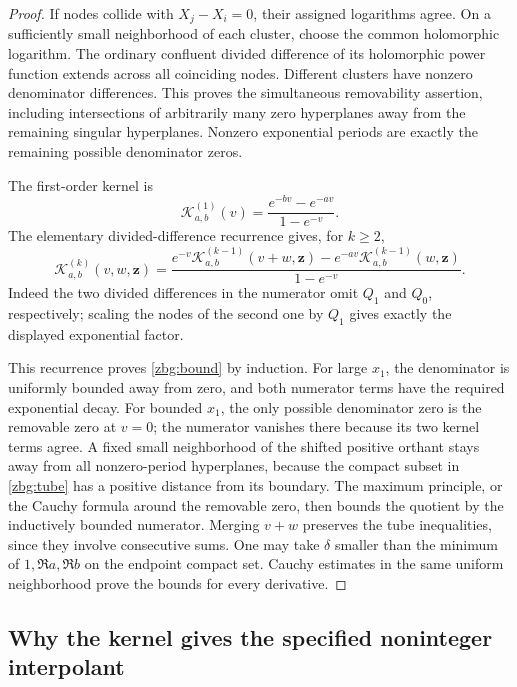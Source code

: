 \begin{proof}
If nodes collide with $X_j-X_i=0$, their assigned logarithms agree.
On a sufficiently small neighborhood of each cluster, choose the common
holomorphic logarithm.  The ordinary confluent divided difference of
its holomorphic power function extends across all coinciding nodes.
Different clusters have nonzero denominator differences.  This proves
the simultaneous removability assertion, including intersections of
arbitrarily many zero hyperplanes away from the remaining singular
hyperplanes. Nonzero exponential periods are
exactly the remaining possible denominator zeros.

The first-order kernel is
\[
 \mathscr K_{a,b}^{(1)}(v)=\frac{e^{-bv}-e^{-av}}{1-e^{-v}}.
\]
The elementary divided-difference recurrence gives, for $k\geq2$,
\begin{equation}\label{zbg:recurrence}
 \mathscr K_{a,b}^{(k)}(v,w,\boldsymbol z)=
 \frac{e^{-v}\mathscr K_{a,b}^{(k-1)}(v+w,\boldsymbol z)
       -e^{-av}\mathscr K_{a,b}^{(k-1)}(w,\boldsymbol z)}
      {1-e^{-v}}.
\end{equation}
Indeed the two divided differences in the numerator omit $Q_1$ and
$Q_0$, respectively; scaling the nodes of the second one by $Q_1$
gives exactly the displayed exponential factor.

This recurrence proves \eqref{zbg:bound} by induction.  For large
$x_1$, the denominator is uniformly bounded away from zero, and both
numerator terms have the required exponential decay.  For bounded
$x_1$, the only possible denominator zero is the removable zero at
$v=0$; the numerator vanishes there because its two kernel terms agree.  A fixed small neighborhood of the shifted positive orthant
stays away from all nonzero-period hyperplanes, because the compact
subset in \eqref{zbg:tube} has a positive distance from its boundary.
The maximum principle, or the Cauchy formula around the removable
zero, then bounds the quotient by the inductively bounded numerator.
Merging $v+w$ preserves the tube inequalities, since they involve
consecutive sums.  One may take $\delta$ smaller than the minimum of
$1,\Re a,\Re b$ on the endpoint compact set.  Cauchy estimates in the
same uniform neighborhood prove the bounds for every derivative.
\end{proof}

\subsection{Why the kernel gives the specified noninteger interpolant}

